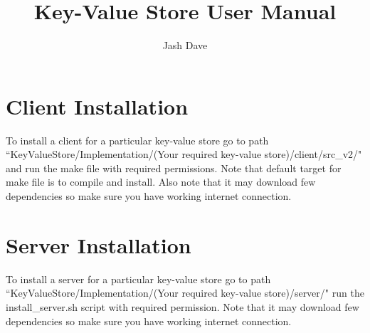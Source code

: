 \documentclass[11pt]{article}
\title{\textbf{Key-Value Store User Manual}}
\author{Jash Dave}
\date{}
\begin{document}
\maketitle

\section{Client Installation}
To install a client for a particular key-value store go to path \\ ``KeyValueStore/Implementation/(Your required key-value store)/client/src\_v2/" and run the make file with required permissions. Note that default target for make file is to compile and install. Also note that it may download few dependencies so make sure you have working internet connection.

\section{Server Installation}
To install a server for a particular key-value store go to path \\ ``KeyValueStore/Implementation/(Your required key-value store)/server/" run the install\_server.sh script with required permission. Note that it may download few dependencies so make sure you have working internet connection.
\end{document}
